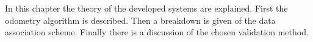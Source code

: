 In this chapter the theory of the developed systems are explained. First the odometry algorithm is described. Then a breakdown is given of the data association scheme. Finally there is a discussion of the chosen validation method.